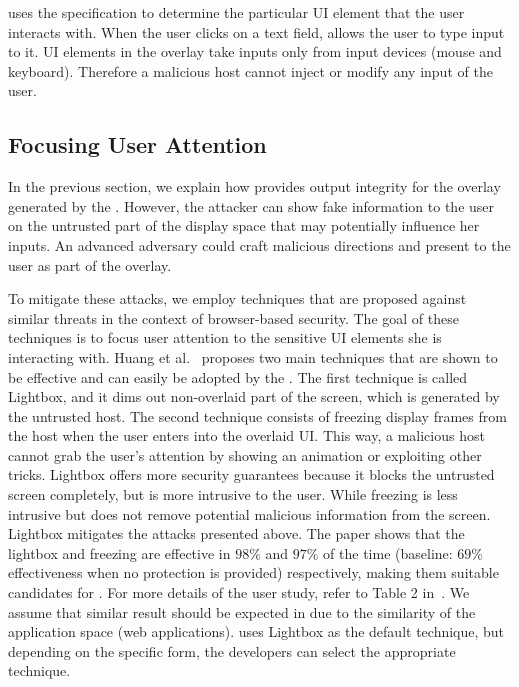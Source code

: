 \device uses the specification to determine the particular UI element that the user interacts with. When the user clicks on a text field, \device allows the user to type input to it. UI elements in the overlay take inputs only from input devices (mouse and keyboard). Therefore a malicious host cannot inject or modify any input of the user.

\subsection{Focusing User Attention}
\label{sec:systemDesign:userAttention}

In the previous section, we explain how \name provides output integrity for the overlay generated by the \device. However, the attacker can show fake information to the user on the untrusted part of the display space that may potentially influence her inputs. An advanced adversary could craft malicious directions and present to the user as part of the overlay.

To mitigate these attacks, we employ techniques that are proposed against similar threats in the context of browser-based security. The goal of these techniques is to focus user attention to the sensitive UI elements she is interacting with. Huang et al.~\cite{huang2012clickjacking} proposes two main techniques that are shown to be effective and can easily be adopted by the \device.  The first technique is called Lightbox, and it dims out non-overlaid part of the screen, which is generated by the untrusted host. The second technique consists of freezing display frames from the host when the user enters into the overlaid UI. This way, a malicious host cannot grab the user's attention by showing an animation or exploiting other tricks.
Lightbox offers more security guarantees because it blocks the untrusted screen completely, but is more intrusive to the user. While freezing is less intrusive but does not remove potential malicious information from the screen.
Lightbox mitigates the attacks presented above. The paper shows that the lightbox and freezing are effective in $98\%$ and $97\%$ of the time (baseline: $69\%$ effectiveness when no protection is provided) respectively, making them suitable candidates for \name. For more details of the user study, refer to Table 2 in~\cite{huang2012clickjacking}. We assume that similar result should be expected in \name due to the similarity of the application space (web applications). \device uses Lightbox as the default technique, but depending on the specific form, the developers can select the appropriate technique.

